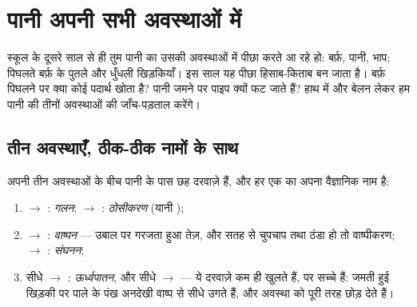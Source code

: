 \chapter{पानी अपनी सभी अवस्थाओं में}\label{ch:g6:water-states}

स्कूल के दूसरे साल से ही तुम पानी का उसकी अवस्थाओं में पीछा करते आ रहे
हो: बर्फ़, पानी, भाप; पिघलते बर्फ़ के पुतले और धुँधली खिड़कियाँ। इस
साल यह पीछा हिसाब-किताब बन जाता है। बर्फ़ पिघलने पर क्या कोई पदार्थ
खोता है? पानी जमने पर पाइप क्यों फट जाते हैं? हाथ में  और बेलन
लेकर हम पानी की तीनों अवस्थाओं की जाँच-पड़ताल करेंगे।

\section{तीन अवस्थाएँ, ठीक-ठीक नामों के साथ}

\begin{definition}\label{def:g6:water-states:changes}
अपनी तीन अवस्थाओं के बीच पानी के पास छह दरवाज़े हैं, और हर एक का अपना
वैज्ञानिक नाम है:
\begin{enumerate}
  \item {} $\to$ : \emph{गलन};
         $\to$ :
        \emph{ठोसीकरण} (यानी );
  \item {} $\to$ : \emph{वाष्पन}
        --- उबाल पर गरजता हुआ तेज़, और सतह से चुपचाप तथा ठंडा हो तो
        वाष्पीकरण;  $\to$ :
        \emph{संघनन};
  \item सीधे  $\to$ :
        \emph{ऊर्ध्वपातन}, और सीधे  $\to$ 
        --- ये दरवाज़े कम ही खुलते हैं, पर सच्चे हैं: जमती हुई
        खिड़की पर पाले के पंख अनदेखी वाष्प से सीधे उगते हैं, और
         अवस्था को पूरी तरह छोड़ देते हैं।
\end{enumerate}
\end{definition}

